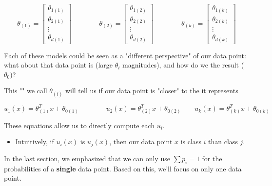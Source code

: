         \begin{equation}
            \theta_{(1)} = 
            \begin{bmatrix}
                \theta_{1(1)} \\ \theta_{2(1)} \\ \vdots \\ \theta_{d(1)}
            \end{bmatrix}
            \qquad\qquad
            \theta_{(2)} = 
            \begin{bmatrix}
                \theta_{1(2)} \\ \theta_{2(2)} \\ \vdots \\ \theta_{d(2)}
            \end{bmatrix}
            \qquad\qquad
            \theta_{(k)} = 
            \begin{bmatrix}
                \theta_{1(k)} \\ \theta_{2(k)} \\ \vdots \\ \theta_{d(k)}
            \end{bmatrix}
        \end{equation}
        
        Each of these models could be seen as a "different perspective" of our data point: what about that data point is  (large $\theta_i$ magnitudes), and how do we  the result ($\theta_0$)?

        This "" we call $\theta_{(i)}$ will tell us if our data point is "closer" to the  it represents
        
        
        \begin{equation}
            u_1(x) = \theta_{(1)}^T x + \theta_{0(1)}
            \qquad\qquad
            u_2(x) = \theta_{(2)}^T x + \theta_{0(2)}
            \quad \quad
            u_k(x) = \theta_{(k)}^T x + \theta_{0(k)}
        \end{equation}

        These equations allow us to directly compute each $u_i$.

        \begin{itemize}
            \item Intuitively, if $u_i(x)$ is  $u_j(x)$, then our data point $x$ is  class $i$ than class $j$.
        \end{itemize}

        In the last section, we emphasized that we can only use $\sum p_i=1$ for the probabilities of a \textbf{single} data point. Based on this, we'll focus on only one data point.\\

